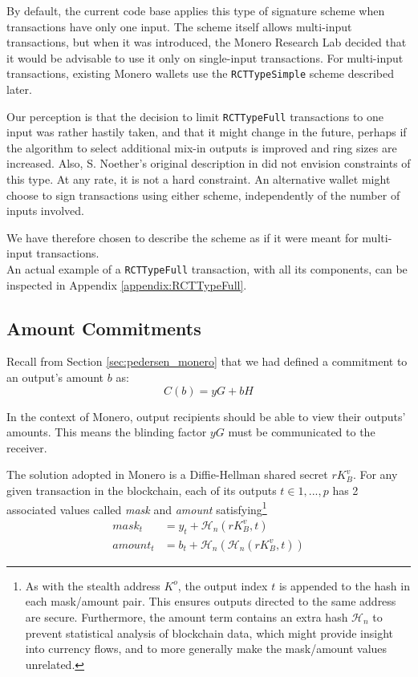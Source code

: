 By default, the current code base applies this type of signature scheme when transactions have only one input. The scheme itself allows multi-input transactions, but when it was introduced, the Monero Research Lab decided that it would be advisable to use it only on single-input transactions. For multi-input transactions, existing Monero wallets use the {\tt RCTTypeSimple} scheme described later.

Our perception is that the decision to limit {\tt RCTTypeFull} transactions to one input was rather hastily taken, and that it might change in the future, perhaps if the algorithm to select additional mix-in outputs is improved and ring sizes are increased. Also, S. Noether’s original description in \cite{ledger34} did not envision constraints of this type. At any rate, it is not a hard constraint. An alternative wallet might choose to sign transactions using either scheme, independently of the number of inputs involved.

We have therefore chosen to describe the scheme as if it were meant for multi-input transactions.
\\

An actual example of a {\tt RCTTypeFull} transaction, with all its components, can be inspected in Appendix \ref{appendix:RCTTypeFull}.


\subsection{Amount Commitments}
\label{amount-commitments}
Recall from Section \ref{sec:pedersen_monero} that we had defined a commitment to an output’s amount $b$ as: 
\[C(b) = y G + b H\]

In the context of Monero, output recipients should be able to view their outputs’ amounts. This means the blinding factor $y G$ must be communicated to the receiver.

The solution adopted in Monero is a Diffie-Hellman shared secret $r K_B^v$. For any given transaction in the blockchain, each of its outputs $t \in {1, ..., p}$ has 2 associated values called {\em mask} and {\em amount}  satisfying\footnote{As with the stealth address $K^o$, the output index $t$ is appended to the hash in each mask/amount pair. This ensures outputs directed to the same address are secure.
Furthermore, the amount term contains an extra hash $\mathcal{H}_n$ to prevent statistical analysis of blockchain data, which might provide insight into currency flows, and to more generally make the mask/amount values unrelated.}
\begin{align*}
  \mathit{mask}_t     &= y_t + \mathcal{H}_n(r K_B^v, t) \\
  \mathit{amount}_t   &= b_t + \mathcal{H}_n(\mathcal{H}_n(r K_B^v, t))
\end{align*}

